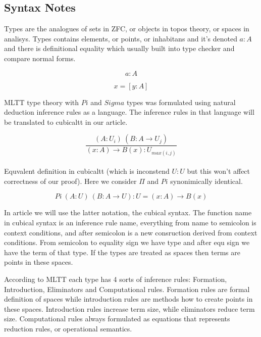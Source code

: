 \documentclass{article}
\begin{document}
\subsection{Syntax Notes}

Types are the analogues of sets in ZFC, or objects in topos theory, or spaces in analisys.
Types contains elements, or points, or inhabitans and it's denoted $a : A$ and there
is definitional equality which usually built into type checker and compare normal forms.

\begin{equation}
\tag{terms and types}
a : A
\end{equation}

\begin{equation}
\tag{definitional equality}
x = [ y : A ]
\end{equation}

MLTT type theory with $Pi$ and $Sigma$ types was formulated using
natural deduction inference rules as a language.
The inference rules in that language will
be translated to cubicaltt in our article.

\begin{equation}
\tag{natural deduction}
\dfrac
{(A: U_i)\ (B: A \rightarrow U_j)}
{(x: A) \rightarrow B(x): U_{max(i,j)}}
\end{equation}
\\
Equvalent definition in cubicaltt (which is inconstend $U : U$ but
this won't affect correctness of our proof). Here we consider $\Pi$
and $Pi$ synonimically identical. 

\begin{equation}
\tag{cubicaltt}
Pi\ (A: U)\ (B: A \rightarrow U): U = (x: A) \rightarrow B(x)
\end{equation}

In article we will use the latter notation, the cubical syntax.
The function name in cubical syntax is an inference rule name,
everything from name to semicolon is context conditions,
and after semicolon is a new consruction derived from context conditions.
From semicolon to equality sign we have type and after
equ sign we have the term of that type.
If the types are treated as spaces then terms are points in these spaces.

According to MLTT each type has 4 sorts of inference rules:
Formation, Introduction, Eliminators and Computational rules.
Formation rules are formal definition of spaces while introduction rules
are methods how to create points in these spaces. Introduction rules increase term size,
while eliminators reduce term size. Computational rules always
formulated as equations that represents reduction rules,
or operational semantics.
\end{document}
